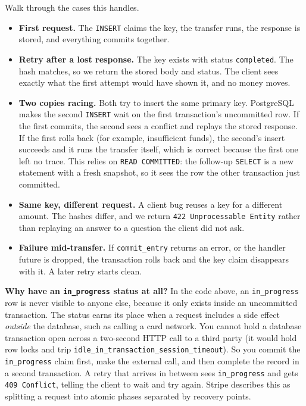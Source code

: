 Walk through the cases this handles.
\begin{itemize}
  \item \textbf{First request.} The \texttt{INSERT} claims the key, the transfer runs, the response is stored, and everything commits together.
  \item \textbf{Retry after a lost response.} The key exists with status \texttt{completed}. The hash matches, so we return the stored body and status. The client sees exactly what the first attempt would have shown it, and no money moves.
  \item \textbf{Two copies racing.} Both try to insert the same primary key. PostgreSQL makes the second \texttt{INSERT} wait on the first transaction's uncommitted row. If the first commits, the second sees a conflict and replays the stored response. If the first rolls back (for example, insufficient funds), the second's insert succeeds and it runs the transfer itself, which is correct because the first one left no trace. This relies on \texttt{READ COMMITTED}: the follow-up \texttt{SELECT} is a new statement with a fresh snapshot, so it sees the row the other transaction just committed.
  \item \textbf{Same key, different request.} A client bug reuses a key for a different amount. The hashes differ, and we return \texttt{422 Unprocessable Entity} rather than replaying an answer to a question the client did not ask.
  \item \textbf{Failure mid-transfer.} If \texttt{commit\_entry} returns an error, or the handler future is dropped, the transaction rolls back and the key claim disappears with it. A later retry starts clean.
\end{itemize}

\begin{intuitionbox}
\textbf{Why have an \texttt{in\_progress} status at all?} In the code above, an \texttt{in\_progress} row is never visible to anyone else, because it only exists inside an uncommitted transaction. The status earns its place when a request includes a side effect \emph{outside} the database, such as calling a card network. You cannot hold a database transaction open across a two-second HTTP call to a third party (it would hold row locks and trip \texttt{idle\_in\_transaction\_session\_timeout}). So you commit the \texttt{in\_progress} claim first, make the external call, and then complete the record in a second transaction. A retry that arrives in between sees \texttt{in\_progress} and gets \texttt{409 Conflict}, telling the client to wait and try again. Stripe describes this as splitting a request into atomic phases separated by recovery points.
\end{intuitionbox}


